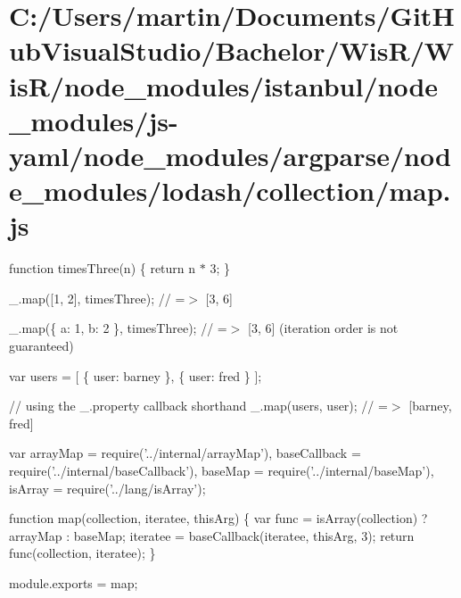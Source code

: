 \hypertarget{_c_1_2_users_2martin_2_documents_2_git_hub_visual_studio_2_bachelor_2_wis_r_2_wis_r_2node_module4ced2e2ffc7f13e036cc740269cc9113}{}\section{C\+:/\+Users/martin/\+Documents/\+Git\+Hub\+Visual\+Studio/\+Bachelor/\+Wis\+R/\+Wis\+R/node\+\_\+modules/istanbul/node\+\_\+modules/js-\/yaml/node\+\_\+modules/argparse/node\+\_\+modules/lodash/collection/map.\+js}
function times\+Three(n) \{ return n $\ast$ 3; \}

\+\_\+.\+map(\mbox{[}1, 2\mbox{]}, times\+Three); // =$>$ \mbox{[}3, 6\mbox{]}

\+\_\+.\+map(\{ \textquotesingle{}a\textquotesingle{}\+: 1, \textquotesingle{}b\textquotesingle{}\+: 2 \}, times\+Three); // =$>$ \mbox{[}3, 6\mbox{]} (iteration order is not guaranteed)

var users = \mbox{[} \{ \textquotesingle{}user\textquotesingle{}\+: \textquotesingle{}barney\textquotesingle{} \}, \{ \textquotesingle{}user\textquotesingle{}\+: \textquotesingle{}fred\textquotesingle{} \} \mbox{]};

// using the {\ttfamily \+\_\+.\+property} callback shorthand \+\_\+.\+map(users, \textquotesingle{}user\textquotesingle{}); // =$>$ \mbox{[}\textquotesingle{}barney\textquotesingle{}, \textquotesingle{}fred\textquotesingle{}\mbox{]}


\begin{DoxyCodeInclude}
var arrayMap = require(\textcolor{stringliteral}{'../internal/arrayMap'}),
    baseCallback = require(\textcolor{stringliteral}{'../internal/baseCallback'}),
    baseMap = require(\textcolor{stringliteral}{'../internal/baseMap'}),
    isArray = require(\textcolor{stringliteral}{'../lang/isArray'});

\textcolor{keyword}{function} map(collection, iteratee, thisArg) \{
  var func = isArray(collection) ? arrayMap : baseMap;
  iteratee = baseCallback(iteratee, thisArg, 3);
  \textcolor{keywordflow}{return} func(collection, iteratee);
\}

module.exports = map;
\end{DoxyCodeInclude}
 